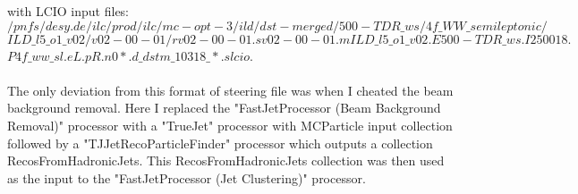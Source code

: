 with LCIO input files:\\
\texttt{$/pnfs/desy.de/ilc/prod/ilc/mc-opt-3/ild/dst-merged/500-TDR\_ws/4f\_WW\_semileptonic/$}
\texttt{$ILD\_l5\_o1\_v02/v02-00-01/rv02-00-01.sv02-00-01.mILD\_l5\_o1\_v02.E500-TDR\_ws.I250018.$}
\texttt{$P4f\_ww\_sl.eL.pR.n0*.d\_dstm\_10318\_*.slcio$}.
\\\\
The only deviation from this format of steering file was when I cheated the beam background removal. Here I replaced the "FastJetProcessor (Beam Background Removal)" processor with a "TrueJet" processor with MCParticle input collection followed by a "TJJetRecoParticleFinder" processor which outputs a collection RecosFromHadronicJets. This RecosFromHadronicJets collection was then used as the input to the "FastJetProcessor (Jet Clustering)" processor.

